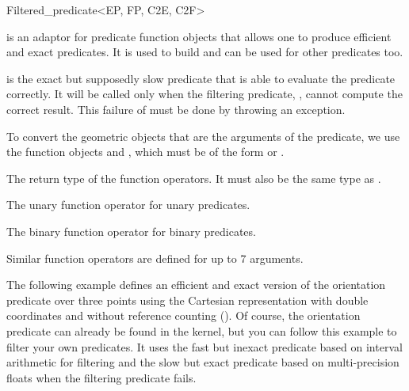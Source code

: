 \begin{ccRefClass}{Filtered_predicate<EP, FP, C2E, C2F>}

\KernelRefLayout\gdef\ccTagOperatorLayout{\ccFalse}

\ccDefinition

\ccClassTemplateName is an adaptor for predicate function objects that allows
one to produce efficient and exact predicates.  It is used to build
 and can be used for other
predicates too.

 is the exact but supposedly slow predicate that is able to evaluate
the predicate correctly.  It will be called only when the filtering predicate,
, cannot compute the correct result.  This failure of  must be
done by throwing an exception.

To convert the geometric objects that are the arguments of the predicate,
we use the function objects  and , which must be of the form
 or .


\ccTypes
{}
{ The return type of the function operators.
  It must also be the same type as .}

\ccCreation
{}


\ccOperations

{ The unary function operator for unary predicates. }

{ The binary function operator for binary predicates. }

Similar function operators are defined for up to 7 arguments.

\ccExample

The following example defines an efficient and exact version of the
orientation predicate over three points using the Cartesian representation
with double coordinates and without reference counting
().
Of course, the orientation predicate can already be found in the kernel, but
you can follow this example to filter your own predicates.
It uses the fast but inexact predicate based on interval arithmetic for
filtering and the slow but exact predicate based on multi-precision floats
when the filtering predicate fails.


\end{ccRefClass}
